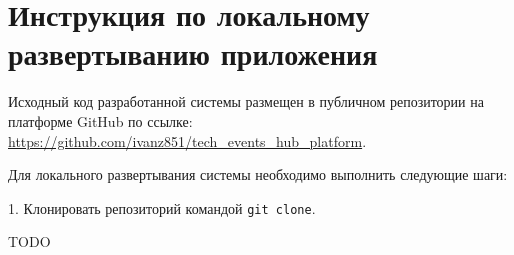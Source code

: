 \chapter{Инструкция по локальному развертыванию приложения}
\label{app:local-app-deployment}

Исходный код разработанной системы размещен в публичном репозитории на платформе GitHub по ссылке: \url{https://github.com/ivanz851/tech_events_hub_platform}.

Для локального развертывания системы необходимо выполнить следующие шаги:

1. Клонировать репозиторий командой \texttt{git clone}.

TODO